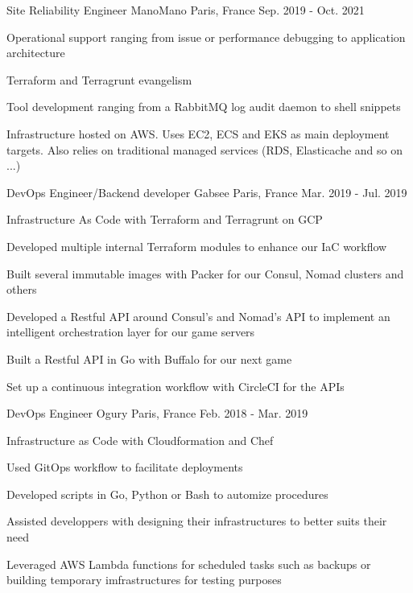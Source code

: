 \begin{cventries}
  \cventry
    {Site Reliability Engineer} %
    {ManoMano} %
    {Paris, France} %
    {Sep. 2019 - Oct. 2021} %
    {
      \begin{cvitems} %
        \item {Operational support ranging from issue or performance debugging to application architecture}
        \item {Terraform and Terragrunt evangelism}
        \item {Tool development ranging from a RabbitMQ log audit daemon to shell snippets}
        \item {Infrastructure hosted on AWS. Uses EC2, ECS and EKS as main deployment targets. Also relies on traditional managed services (RDS, Elasticache and so on ...)}
      \end{cvitems}
    }

  \cventry
    {DevOps Engineer/Backend developer} %
    {Gabsee} %
    {Paris, France} %
    {Mar. 2019 - Jul. 2019} %
    {
      \begin{cvitems} %
        \item {Infrastructure As Code with Terraform and Terragrunt on GCP}
        \item {Developed multiple internal Terraform  modules to enhance our IaC workflow}
        \item {Built several immutable images with Packer for our Consul, Nomad clusters and others}
        \item {Developed a Restful API around Consul's and Nomad's API to implement an intelligent orchestration layer for our game servers}
        \item {Built a Restful API in Go with Buffalo for our next game}
        \item {Set up a continuous integration workflow with CircleCI for the APIs}
      \end{cvitems}
    }

  \cventry
    {DevOps Engineer} %
    {Ogury} %
    {Paris, France} %
    {Feb. 2018 - Mar. 2019} %
    {
      \begin{cvitems} %
        \item {Infrastructure as Code with Cloudformation and Chef}
        \item {Used GitOps workflow to facilitate deployments}
        \item {Developed scripts in Go, Python or Bash to automize procedures}
        \item {Assisted developpers with designing their infrastructures to better suits their need}
        \item {Leveraged AWS Lambda functions for scheduled tasks such as backups or building temporary imfrastructures for testing purposes}
      \end{cvitems}
    }


\end{cventries}
